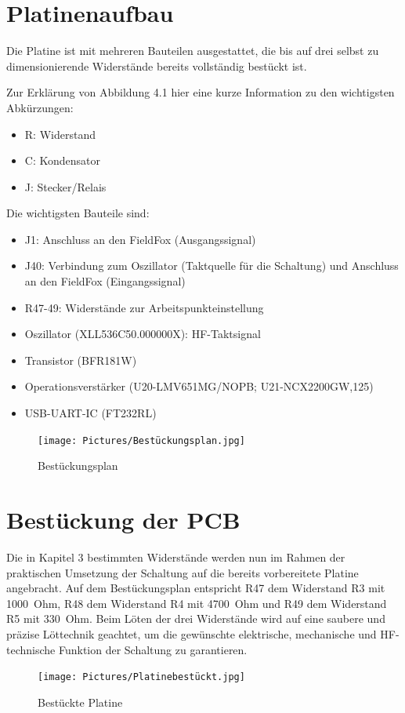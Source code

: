 \section{Platinenaufbau}
Die Platine ist mit mehreren Bauteilen ausgestattet, die bis auf drei selbst zu dimensionierende Widerstände bereits vollständig bestückt ist.

Zur Erklärung von Abbildung 4.1 hier eine kurze Information zu den wichtigsten Abkürzungen:
\begin{itemize}
    \item R: Widerstand
    \item C: Kondensator
    \item J: Stecker/Relais
\end{itemize}

Die wichtigsten Bauteile sind:
\begin{itemize}
    \item J1: Anschluss an den FieldFox (Ausgangssignal)
    \item J40: Verbindung zum Oszillator (Taktquelle für die Schaltung) und Anschluss an den FieldFox (Eingangssignal)
    \item R47-49: Widerstände zur Arbeitspunkteinstellung
    \item Oszillator (XLL536C50.000000X): HF-Taktsignal
    \item Transistor (BFR181W)
    \item Operationsverstärker (U20-LMV651MG/NOPB; U21-NCX2200GW,125)
    \item USB-UART-IC (FT232RL)
\end{itemize}

\begin{figure}[h]
    \centering
    \texttt{[image: Pictures/Bestückungsplan.jpg]}
    \caption{Bestückungsplan}
\end{figure}

\section{Bestückung der PCB}
Die in Kapitel 3 bestimmten Widerstände werden nun im Rahmen der praktischen Umsetzung der Schaltung auf die bereits vorbereitete Platine angebracht. Auf dem Bestückungsplan entspricht R47 dem Widerstand R3 mit 1000~Ohm, R48 dem Widerstand R4 mit 4700~Ohm und R49 dem Widerstand R5 mit 330~Ohm. Beim Löten der drei Widerstände wird auf eine saubere und präzise Löttechnik geachtet, um die gewünschte elektrische, mechanische und HF-technische Funktion der Schaltung zu garantieren.
\begin{figure}[h]
    \centering
    \texttt{[image: Pictures/Platinebestückt.jpg]}
    \caption{Bestückte Platine}
\end{figure}

